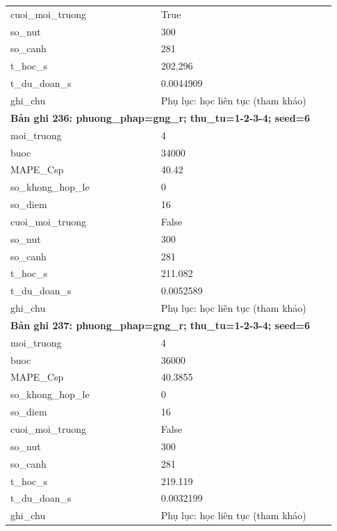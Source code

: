\begin{longtable}{p{0.43\linewidth}p{0.50\linewidth}}
cuoi\_\allowbreak moi\_\allowbreak truong & True \\
so\_\allowbreak nut & 300 \\
so\_\allowbreak canh & 281 \\
t\_\allowbreak hoc\_\allowbreak s & 202.296 \\
t\_\allowbreak du\_\allowbreak doan\_\allowbreak s & 0.0044909 \\
ghi\_\allowbreak chu & Phụ lục: học liên tục (tham khảo) \\
\midrule
\multicolumn{2}{p{0.95\linewidth}}{\textbf{Bản ghi 236: phuong\_phap=gng\_r; thu\_tu=1-2-3-4; seed=6}} \\
moi\_\allowbreak truong & 4 \\
buoc & 34000 \\
MAPE\_\allowbreak Csp & 40.42 \\
so\_\allowbreak khong\_\allowbreak hop\_\allowbreak le & 0 \\
so\_\allowbreak diem & 16 \\
cuoi\_\allowbreak moi\_\allowbreak truong & False \\
so\_\allowbreak nut & 300 \\
so\_\allowbreak canh & 281 \\
t\_\allowbreak hoc\_\allowbreak s & 211.082 \\
t\_\allowbreak du\_\allowbreak doan\_\allowbreak s & 0.0052589 \\
ghi\_\allowbreak chu & Phụ lục: học liên tục (tham khảo) \\
\midrule
\multicolumn{2}{p{0.95\linewidth}}{\textbf{Bản ghi 237: phuong\_phap=gng\_r; thu\_tu=1-2-3-4; seed=6}} \\
moi\_\allowbreak truong & 4 \\
buoc & 36000 \\
MAPE\_\allowbreak Csp & 40.3855 \\
so\_\allowbreak khong\_\allowbreak hop\_\allowbreak le & 0 \\
so\_\allowbreak diem & 16 \\
cuoi\_\allowbreak moi\_\allowbreak truong & False \\
so\_\allowbreak nut & 300 \\
so\_\allowbreak canh & 281 \\
t\_\allowbreak hoc\_\allowbreak s & 219.119 \\
t\_\allowbreak du\_\allowbreak doan\_\allowbreak s & 0.0032199 \\
ghi\_\allowbreak chu & Phụ lục: học liên tục (tham khảo) \\

\end{longtable}
